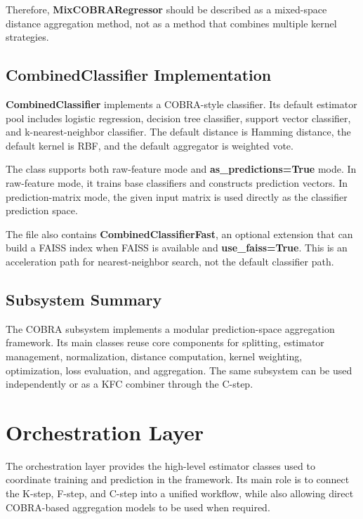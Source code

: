 Therefore, \textbf{MixCOBRARegressor} should be described as a mixed-space distance aggregation method, not as a method that combines multiple kernel strategies.

\subsection{CombinedClassifier Implementation}

\hs\textbf{CombinedClassifier} implements a COBRA-style classifier. Its default estimator pool includes logistic regression, decision tree classifier, support vector classifier, and k-nearest-neighbor classifier. The default distance is Hamming distance, the default kernel is RBF, and the default aggregator is weighted vote.

The class supports both raw-feature mode and \textbf{as\_predictions=True} mode. In raw-feature mode, it trains base classifiers and constructs prediction vectors. In prediction-matrix mode, the given input matrix is used directly as the classifier prediction space.

The file also contains \textbf{CombinedClassifierFast}, an optional extension that can build a FAISS index when FAISS is available and \textbf{use\_faiss=True}. This is an acceleration path for nearest-neighbor search, not the default classifier path.

\subsection{Subsystem Summary}

\hs The COBRA subsystem implements a modular prediction-space aggregation framework. Its main classes reuse core components for splitting, estimator management, normalization, distance computation, kernel weighting, optimization, loss evaluation, and aggregation. The same subsystem can be used independently or as a KFC combiner through the C-step.



\section{Orchestration Layer}
\label{sec:orchestration_layer}

\hs The orchestration layer provides the high-level estimator classes used to coordinate training and prediction in the framework. Its main role is to connect the K-step, F-step, and C-step into a unified workflow, while also allowing direct COBRA-based aggregation models to be used when required.

